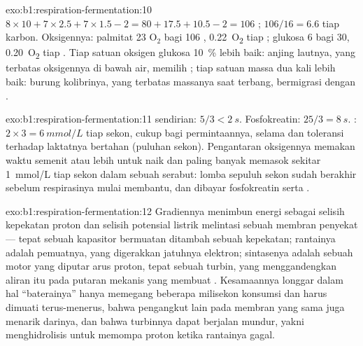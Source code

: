 \begin{solution}{exo:b1:respiration-fermentation:10}
$8\times 10 + 7\times 2.5 + 7\times 1.5 - 2 = 80 + 17.5 + 10.5 - 2 =
106$ ; $106/16 = 6.6$ tiap karbon. Oksigennya: palmitat 23
$\mathrm{O_2}$ bagi 106 , \qty{0.22}{O_2} tiap ; glukosa 6 bagi
30, \qty{0.20}{O_2} tiap . Tiap satuan oksigen glukosa \qty{10}{\%}
lebih baik: anjing lautnya, yang terbatas oksigennya di bawah air,
memilih ; tiap satuan massa  dua kali lebih baik:
burung kolibrinya, yang terbatas massanya saat terbang, bermigrasi
dengan .
\end{solution}

\begin{solution}{exo:b1:respiration-fermentation:11}
 sendirian: $5/3 < \qty{2}{s}$. Fosfokreatin: $25/3 = \qty{8}{s}$.
: $2\times 3 = \qty{6}{mmol/L}$  tiap sekon, cukup bagi
permintaannya, selama  dan toleransi terhadap laktatnya
bertahan (puluhan sekon). Pengantaran oksigennya memakan waktu semenit
atau lebih untuk naik dan paling banyak memasok sekitar
\qty{1}{mmol/L}  tiap sekon dalam sebuah serabut: lomba sepuluh
sekon sudah berakhir sebelum respirasinya mulai membantu, dan dibayar
fosfokreatin serta .
\end{solution}

\begin{solution}{exo:b1:respiration-fermentation:12}
Gradiennya menimbun energi sebagai selisih kepekatan proton dan selisih
potensial listrik melintasi sebuah membran penyekat --- tepat sebuah
kapasitor bermuatan ditambah sebuah  kepekatan; rantainya adalah
pemuatnya, yang digerakkan jatuhnya elektron; sintasenya adalah sebuah
motor yang diputar arus proton, tepat sebuah turbin, yang
menggandengkan aliran itu pada putaran mekanis yang membuat .
Kesamaannya longgar dalam hal ``baterainya'' hanya memegang beberapa
milisekon konsumsi  dan harus dimuati terus-menerus, bahwa
pengangkut lain pada membran yang sama juga menarik darinya, dan bahwa
turbinnya dapat berjalan mundur, yakni menghidrolisis  untuk memompa
proton ketika rantainya gagal.
\end{solution}

